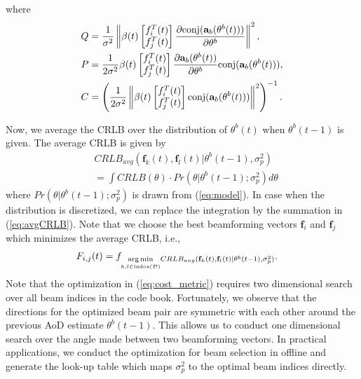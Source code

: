 \documentclass[conference]{IEEEtran}
\begin{document}
where  \begin{align}
Q & = \frac{1}{\sigma^{2}}\left\| \beta(t) \begin{bmatrix} f^{T}_{i}(t) \\ f^{T}_{j}(t)\end{bmatrix}\frac{{\partial\rm conj}(\mathbf{a}_{b}(\theta^{b}(t)))}{\partial \theta^{b}}\right\|^{2}, \nonumber \\
P & = \frac{1}{2\sigma^{2}}\beta(t) \begin{bmatrix} f^{T}_{i}(t) \\ f^{T}_{j}(t)\end{bmatrix}\frac{\partial\mathbf{a}_{b}(\theta^{b}(t))}{\partial \theta^{b}}{\rm conj}(\mathbf{a}_{b}(\theta^{b}(t))), \nonumber \\
C & = \left(\frac{1}{2\sigma^{2}}\left\|\beta(t) \begin{bmatrix} f^{T}_{i}(t) \\ f^{T}_{j}(t)\end{bmatrix}{\rm conj}(\mathbf{a}_{b}(\theta^{b}(t)))\right\|^{2}\right)^{-1}. \nonumber
\end{align}

Now, we average the CRLB over the distribution of $\theta^{b}(t)$ when $\theta^{b}(t-1)$ is given. The average CRLB is given by
\begin{align}
  & CRLB_{avg}(\mathbf{f}_k(t), \mathbf{f}_l(t)|\theta^{b}(t-1),\sigma_p^2)  \nonumber \\
  & = \int CRLB(\theta) \cdot Pr(\theta|\theta^{b}(t-1);\sigma_p^2) d\theta \label{eq:avgCRLB}
\end{align}
where $Pr(\theta|\theta^{b}(t-1);\sigma_p^2)$ is drawn from (\ref{eq:model}).
In case when the distribution is discretized, we can replace the integration by the summation in (\ref{eq:avgCRLB}).
Note that we choose the best beamforming vectors $\mathbf{f}_i$ and $\mathbf{f}_j$ which minimizes the average CRLB, i.e.,
\begin{align}
  F_{i,j}(t) & = f_{\underset{k,l \in {\rm index}(\mathcal{D})}{\arg\min}CRLB_{avg}(\mathbf{f}_k(t), \mathbf{f}_l(t)|\theta^{b}(t-1),\sigma_p^2)}. \label{eq:cost_metric}
\end{align}
Note that the optimization in (\ref{eq:cost_metric}) requires two dimensional search over all beam indices in the code book.
Fortunately, we observe that the directions for the optimized beam pair are symmetric with each other around the previous AoD estimate $\theta^{b}(t-1)$.
This allows us to conduct one dimensional search over the angle made between two beamforming vectors.
In practical applications, we conduct the optimization for beam selection in offline and generate the look-up table which maps $\sigma_p^2$ to the optimal beam indices directly.
\end{document}
